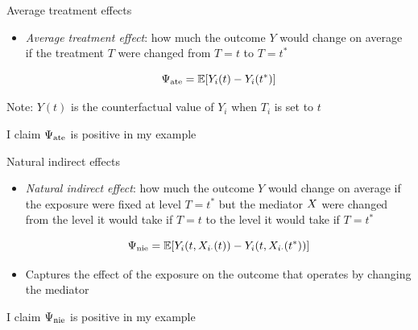 \documentclass{beamer}
\theoremstyle{remark}
\begin{document}
\begin{frame}{Average treatment effects}

    \begin{itemize}
        \item \emph{Average treatment effect}: how much the outcome $Y$ would change on average if the treatment $T$ were changed from $T = t$ to $T = t^*$

              \begin{equation*}
                  \ate = \E{Y_i(t) - Y_i(t^*)}
              \end{equation*}
    \end{itemize}

    Note: $Y(t)$ is the counterfactual value of $Y_i$ when $T_i$ is set to $t$

    I claim $\Psi_\mathrm{ate}$ is positive in my example

\end{frame}


\begin{frame}{Natural indirect effects}

    \begin{itemize}
        \item \emph{Natural indirect effect}: how much the outcome $Y$ would change on average if the exposure were fixed at level $T = t^*$ but the mediator $X$ were changed from the level it would take if $T = t$ to the level it would take if $T = t^*$

              \begin{equation*}
                  \nie = \E{Y_i (t, \X_{i \cdot}(t)) - Y_i (t, \X_{i \cdot} (t^*))}
              \end{equation*}

        \item Captures the effect of the exposure on the outcome that operates by changing the mediator
    \end{itemize}

    I claim $\Psi_\mathrm{nie}$ is positive in my example

\end{frame}
\end{document}
